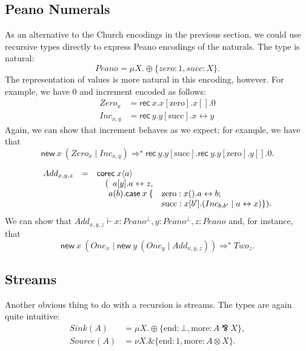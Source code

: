 \documentclass[orivec,envcountsame]{llncs}
\newcommand{\with}{\mathbin\binampersand}
\newcommand{\parr}{\mathbin\bindnasrepma}
\newcommand{\cpdual}[1]{#1^\perp}
\newcommand{\cptyp}[2]{#1 \vdash #2}
\newcommand{\mkwd}[1]{\mathsf{#1}}
\newcommand{\link}[2]{#1 \leftrightarrow #2}
\newcommand{\cut}[4]{\mkwd{new}\:#1 \: (#3 \mid #4)}
\newcommand{\rec}[1]{\mkwd{rec}\:#1}
\newcommand{\clabel}[1]{\mathrm{#1}}
\newcommand{\sel}[2]{#1[\clabel{#2}]}
\begin{document}
\subsection{Peano Numerals}

As an alternative to the Church encodings in the previous section, we could use recursive types
directly to express Peano encodings of the naturals.  The type is natural:
%
{\small\[
  Peano = \mu X.\oplus\{zero: 1, succ: X\}.
\]}
%
The representation of values is more natural in this encoding, however.  For example, we have 0 and
increment encoded as follows:
%
{\small\begin{align*}
  Zero_x &= \rec{x}.\sel{x}{zero}.x[].0 \\
  Inc_{x,y} &= \rec{y}.\sel{y}{succ}.\link{x}{y}
\end{align*}}
Again, we can show that increment behaves as we expect; for example, we have that
%
{\small\[
  \cut{x}{Peano}{Zero_x}{Inc_{x,y}} \Longrightarrow^\star \rec{y}.\sel{y}{succ}.\rec{y}.\sel{y}{zero}.y[].0.
\]}

{\small\[\begin{array}{rcl@{\hspace{0mm}}ll}
  Add_{x,y,z} & = & \mcl{3}{\mkwd{corec}\:x\langle a \rangle} \\
  & & \quad (&\mcl{2}{a[y].\link{a}{z},} \\
  & & & a(b).\mkwd{case}\:x\:\{&\clabel{zero}: x().\link{a}{b}; \\
  & & & & \clabel{succ}: x[b'].(Inc_{b,b'} \mid  \link{a}{x}) \}).
\end{array}\]}
We can show that $\cptyp{Add_{x,y,z}}{x:\cpdual{Peano}, y:\cpdual{Peano}, z:Peano}$ and, for instance,
that
%
{\small\[
  \cut{x}{Peano}{One_x}{\cut{y}{Peano}{One_y}{Add_{x,y,z}}} \Longrightarrow^\star Two_z.
\]}

\subsection{Streams}

Another obvious thing to do with a recursion is streams.  The types are again quite intuitive:
{\small\begin{align*}
  Sink(A) &= \mu X. \oplus \{ \clabel{end}: \bot, \clabel{more}: A \parr X \}, \\
  Source(A) &= \nu X. \with \{ \clabel{end}: 1, \clabel{more}: A \otimes X \}.
\end{align*}}
\end{document}
